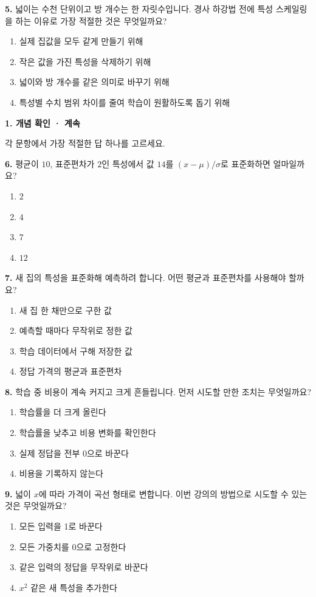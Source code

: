 \documentclass[11pt,a4paper]{article}
\newcommand{\parttitle}[2]{{\large\bfseries\color{ink} #1}\par{\small #2}\par\vspace{5mm}}
\newcommand{\question}[2]{\textbf{#1.} #2\par}
\begin{document}
\question{5}{넓이는 수천 단위이고 방 개수는 한 자릿수입니다. 경사 하강법 전에 특성 스케일링을 하는 이유로 가장 적절한 것은 무엇일까요?}
\begin{enumerate}[label=(\arabic*),leftmargin=9mm,itemsep=0pt,topsep=2pt,parsep=0pt]
\item 실제 집값을 모두 같게 만들기 위해
\item 작은 값을 가진 특성을 삭제하기 위해
\item 넓이와 방 개수를 같은 의미로 바꾸기 위해
\item 특성별 수치 범위 차이를 줄여 학습이 원활하도록 돕기 위해
\end{enumerate}\vfill
\newpage
\parttitle{1. 개념 확인 · 계속}{각 문항에서 가장 적절한 답 하나를 고르세요.}
\question{6}{평균이 $10$, 표준편차가 $2$인 특성에서 값 $14$를 $(x-\mu)/\sigma$로 표준화하면 얼마일까요?}
\begin{enumerate}[label=(\arabic*),leftmargin=9mm,itemsep=0pt,topsep=2pt,parsep=0pt]
\item $2$
\item $4$
\item $7$
\item $12$
\end{enumerate}\vfill
\question{7}{새 집의 특성을 표준화해 예측하려 합니다. 어떤 평균과 표준편차를 사용해야 할까요?}
\begin{enumerate}[label=(\arabic*),leftmargin=9mm,itemsep=0pt,topsep=2pt,parsep=0pt]
\item 새 집 한 채만으로 구한 값
\item 예측할 때마다 무작위로 정한 값
\item 학습 데이터에서 구해 저장한 값
\item 정답 가격의 평균과 표준편차
\end{enumerate}\vfill
\question{8}{학습 중 비용이 계속 커지고 크게 흔들립니다. 먼저 시도할 만한 조치는 무엇일까요?}
\begin{enumerate}[label=(\arabic*),leftmargin=9mm,itemsep=0pt,topsep=2pt,parsep=0pt]
\item 학습률을 더 크게 올린다
\item 학습률을 낮추고 비용 변화를 확인한다
\item 실제 정답을 전부 0으로 바꾼다
\item 비용을 기록하지 않는다
\end{enumerate}\vfill
\question{9}{넓이 $x$에 따라 가격이 곡선 형태로 변합니다. 이번 강의의 방법으로 시도할 수 있는 것은 무엇일까요?}
\begin{enumerate}[label=(\arabic*),leftmargin=9mm,itemsep=0pt,topsep=2pt,parsep=0pt]
\item 모든 입력을 1로 바꾼다
\item 모든 가중치를 0으로 고정한다
\item 같은 입력의 정답을 무작위로 바꾼다
\item $x^2$ 같은 새 특성을 추가한다
\end{enumerate}\vfill
\end{document}
